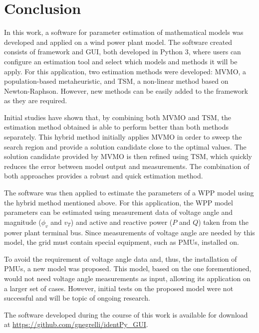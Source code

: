 \chapter{Conclusion}
\label{ch: Conclusion}

In this work, a software for parameter estimation of mathematical models was developed and applied on a wind power plant model. The software created consists of framework and GUI, both developed in Python 3, where users can configure an estimation tool and select which models and methods it will be apply. For this application, two estimation methods were developed: MVMO, a population-based metaheuristic, and TSM, a non-linear method based on Newton-Raphson. However, new methods can be easily added to the framework as they are required.

Initial studies have shown that, by combining both MVMO and TSM, the estimation method obtained is able to perform better than both methods separately. This hybrid method initially applies MVMO in order to sweep the search region and provide a solution candidate close to the optimal values. The solution candidate provided by MVMO is then refined using TSM, which quickly reduces the error between model output and measurements. The combination of both approaches provides a robust and quick estimation method.

The software was then applied to estimate the parameters of a WPP model using the hybrid method mentioned above. For this application, the WPP model parameters can be estimated using measurement data of voltage angle and magnitude ($\phi_{v}$ and $v_{T}$) and active and reactive power ($P$ and $Q$) taken from the power plant terminal bus. Since measurements of voltage angle are needed by this model, the grid must contain special equipment, such as PMUs, installed on.

To avoid the requirement of voltage angle data and, thus, the installation of PMUs, a new model was proposed. This model, based on the one forementioned, would not need voltage angle measurements as input, allowing its application on a larger set of cases. However, initial tests on the proposed model were not successful and will be topic of ongoing research.

The software developed during the course of this work is available for download at \href{https://github.com/gnegrelli/identPy\_GUI}{https://github.com/gnegrelli/identPy\_GUI}.